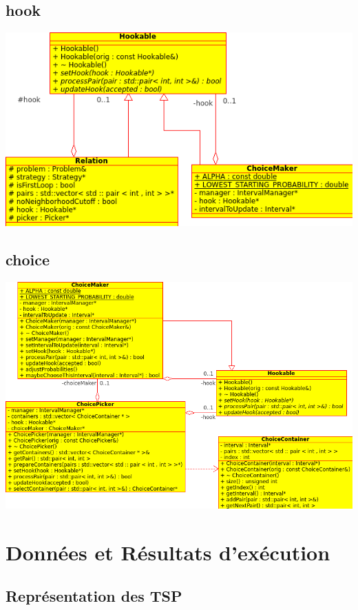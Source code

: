 \documentclass[a4paper,10pt]{report}
\begin{document}
\section{hook}
\includegraphics[width=\textwidth]{../UML/hook.png}

\section{choice}
\includegraphics[width=\textwidth]{../UML/choice.png}



\chapter{Données et Résultats d'exécution}

\section{Représentation des TSP}
\end{document}
